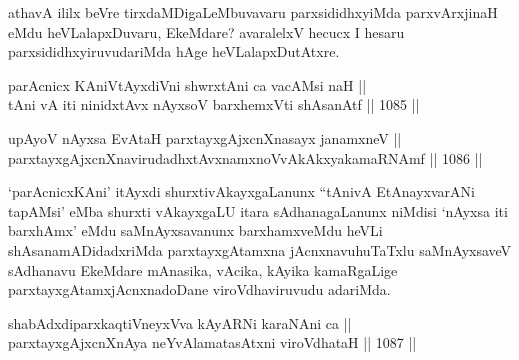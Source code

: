 \begin{artha}
athavA ililx beVre tirxdaMDigaLeMbuvavaru parxsididhxyiMda parxvArxjinaH eMdu heVLalapxDuvaru, EkeMdare? avaralelxV hecucx I hesaru parxsididhxyiruvudariMda hAge heVLalapxDutAtxre.
\end{artha}


\begin{shl}
\footnotemark[1]parAcnicx KAniVtAyxdiVni shwrxtAni ca vacAMsi naH || \\
\footnotemark[2]tAni vA iti ninidxtAvx \footnotemark[3]nAyxsoV barxhemxVti shAsanAtf \hfill || 1085 ||  
\end{shl}
				
\begin{shl}
upAyoV nAyxsa EvAtaH parxtayxgAjxcnXnasayx janamxneV || \\
parxtayxgAjxcnXnavirudadhxtAvxnamxnoVvAkAkxyakamaRNAmf \hfill || 1086 ||  
\end{shl}

\begin{artha}
`parAcnicxKAni' itAyxdi shurxtivAkayxgaLanunx ``tAnivA EtAnayxvarANi tapAMsi' eMba shurxti vAkayxgaLU itara sAdhanagaLanunx niMdisi `nAyxsa iti barxhAmx' eMdu saMnAyxsavanunx barxhamxveMdu heVLi shAsanamADidadxriMda parxtayxgAtamxna jAcnxnavuhuTaTxlu saMnAyxsaveV sAdhanavu EkeMdare mAnasika, vAcika, kAyika kamaRgaLige parxtayxgAtamxjAcnxnadoDane viroVdhaviruvudu adariMda.
\end{artha}


\begin{shl}
shabAdxdiparxkaqtiVneyxVva kAyARNi karaNAni ca || \\
parxtayxgAjxcnXnAya neYvAlamatasAtxni viroVdhataH \hfill || 1087 ||  
\end{shl}	

